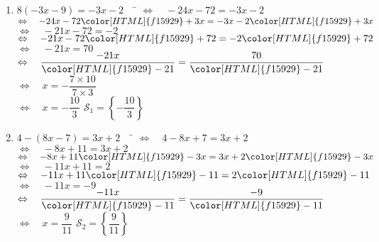 \documentclass[a4paper,11pt,exos]{nsi} %
\begin{document}
\begin{enumerate}
    \item 	\begin{tabbing}
        $ 8(-3x-9)=-3x-2 \quad$		\=	$\Leftrightarrow\quad -24x-72=-3x-2 $\\
        \>	$\Leftrightarrow\quad   -24x-72{\color[HTML]{f15929}+3x}=-3x-2{\color[HTML]{f15929}+3x} $\\
        \>	$\Leftrightarrow\quad   -21x-72=-2 $\\
        \>	$\Leftrightarrow\quad	-21x-72{\color[HTML]{f15929}+72}=-2{\color[HTML]{f15929}+72} $\\
        \>	$\Leftrightarrow\quad   -21x=70 $\\
        \>	$\Leftrightarrow\quad	\dfrac{-21x}{\color[HTML]{f15929}-21}=\dfrac{70}{\color[HTML]{f15929}-21} $\\
        \>	$\Leftrightarrow\quad	x=-\dfrac{7\times 10}{7\times 3} $\\[.5em]
        \>	$\Leftrightarrow\quad	x=-\dfrac{10}{3}$ \hspace{4cm} $\mathcal{S}_1=\left\{ -\dfrac{10}{3} \right\}$
    \end{tabbing}	
    
            
    \item 	\begin{tabbing}
        $ 4-(8x-7)=3x+2 \quad$		\=	$\Leftrightarrow\quad 4-8x+7=3x+2 $\\
        \>	$\Leftrightarrow\quad   -8x+11=3x+2 $\\
        \>	$\Leftrightarrow\quad   -8x+11{\color[HTML]{f15929}-3x}=3x+2{\color[HTML]{f15929}-3x} $\\
        \>	$\Leftrightarrow\quad	-11x+11=2 $\\[.5em]
        \>	$\Leftrightarrow\quad   -11x+11{\color[HTML]{f15929}-11}=2{\color[HTML]{f15929}-11} $\\
        \>	$\Leftrightarrow\quad	-11x=-9 $\\
        \>	$\Leftrightarrow\quad   \dfrac{-11x}{\color[HTML]{f15929}-11}=\dfrac{-9}{\color[HTML]{f15929}-11} $\\
        \>	$\Leftrightarrow\quad	x=\dfrac{9}{11} $ \hspace{4cm} $\mathcal{S}_2=\left\{ \dfrac{9}{11} \right\}$
    \end{tabbing}
    

\end{enumerate}
\end{document}
